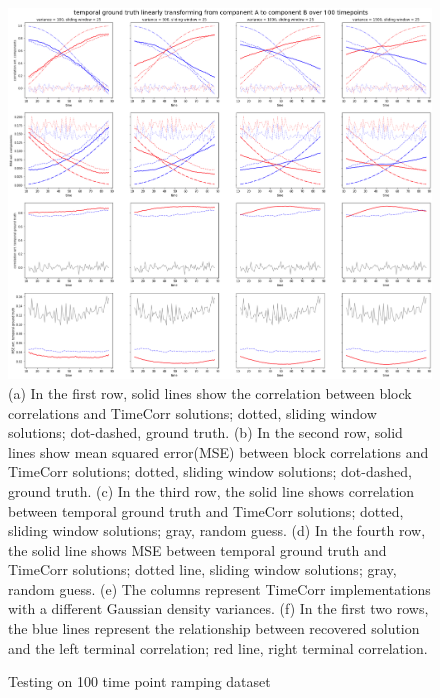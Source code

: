 \documentclass[11pt]{article}
\begin{document}
\begin{figure}[!htb]
\caption{Testing on 100 time point ramping dataset}
\includegraphics[width=1\textwidth]{../figures/SyntheticTesting/ramp100t4var.png}
\label{fig:ramp100t4var}
(a) In the first row, solid lines show the correlation between block correlations and TimeCorr solutions; dotted, sliding window solutions; dot-dashed, ground truth. (b) In the second row, solid lines show mean squared error(MSE) between block correlations and TimeCorr solutions; dotted, sliding window solutions; dot-dashed, ground truth. (c) In the third row, the solid line shows correlation between temporal ground truth and TimeCorr solutions; dotted, sliding window solutions; gray, random guess. (d) In the fourth row, the solid line shows MSE between temporal ground truth and TimeCorr solutions; dotted line, sliding window solutions; gray, random guess. (e) The columns represent TimeCorr implementations with a different Gaussian density variances. (f) In the first two rows, the blue lines represent the relationship between recovered solution and the left terminal correlation; red line, right terminal correlation.
\end{figure}
\end{document}
